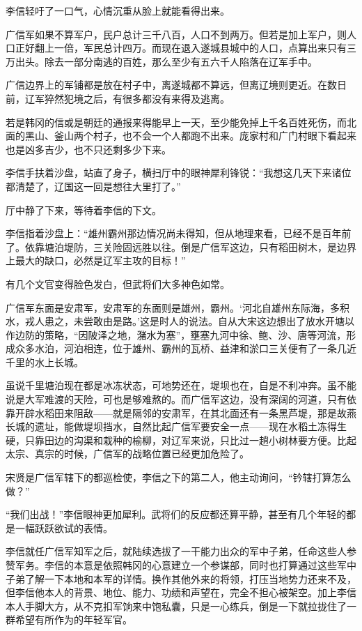 李信轻吁了一口气，心情沉重从脸上就能看得出来。

广信军如果不算军户，民户总计三千八百，人口不到两万。但若是加上军户，则人口正好翻上一倍，军民总计四万。而现在退入遂城县城中的人口，点算出来只有三万出头。除去一部分南逃的百姓，那么至少有五六千人陷落在辽军手中。

广信边界上的军铺都是放在村子中，离遂城都不算远，但离辽境则更近。在数日前，辽军猝然犯境之后，有很多都没有来得及逃离。

若是韩冈的信或是朝廷的通报来得能早上一天，至少能免掉上千名百姓死伤，而北面的黑山、釜山两个村子，也不会一个人都跑不出来。庞家村和广门村眼下看起来也是凶多吉少，也不只还剩多少下来。

李信手扶着沙盘，站直了身子，横扫厅中的眼神犀利锋锐：“我想这几天下来诸位都清楚了，辽国这一回是想往大里打了。”

厅中静了下来，等待着李信的下文。

李信指着沙盘上：“雄州霸州那边情况尚未得知，但从地理来看，已经不是百年前了。依靠塘泊堤防，三关险固远胜以往。倒是广信军这边，只有稻田树木，是边界上最大的缺口，必然是辽军主攻的目标！”

有几个文官变得脸色发白，但武将们大多神色如常。

广信军东面是安肃军，安肃军的东面则是雄州，霸州。‘河北自雄州东际海，多积水，戎人患之，未尝敢由是路。’这是时人的说法。自从大宋这边想出了放水开塘以作边防的策略，“因陂泽之地，潴水为塞”，壅塞九河中徐、鲍、沙、唐等河流，形成众多水泊，河泊相连，位于雄州、霸州的瓦桥、益津和淤口三关便有了一条几近千里的水上长城。

虽说千里塘泊现在都是冰冻状态，可地势还在，堤坝也在，自是不利冲奔。虽不能说是大军难渡的天险，可也是够难熬的。而广信军这边，没有深阔的河道，只有依靠开辟水稻田来阻敌——就是隔邻的安肃军，在其北面还有一条黑芦堤，那是故燕长城的遗址，能做堤坝挡水，自然比起广信军要安全一点——现在水稻土冻得生硬，只靠田边的沟渠和栽种的榆柳，对辽军来说，只比过一趟小树林要方便。比起太宗、真宗的时候，广信军的战略位置已经更加危险了。

宋贤是广信军辖下的都巡检使，李信之下的第二人，他主动询问，“钤辖打算怎么做？”

“我们出战！”李信眼神更加犀利。武将们的反应都还算平静，甚至有几个年轻的都是一幅跃跃欲试的表情。

李信就任广信军知军之后，就陆续选拔了一干能力出众的军中子弟，任命这些人参赞军务。李信的本意是依照韩冈的心意建立一个参谋部，同时也打算通过这些军中子弟了解一下本地和本军的详情。换作其他外来的将领，打压当地势力还来不及，但李信他本人的背景、地位、能力、功绩和声望在，完全不担心被架空。加上李信本人手脚大方，从不克扣军饷来中饱私囊，只是一心练兵，倒是一下就拉拢住了一群希望有所作为的年轻军官。

